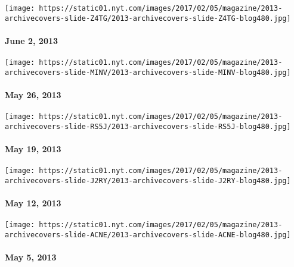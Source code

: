 \href{http://www.nytimes.com/indexes/2013/06/02/magazine/index.html}{}

\texttt{[image: https://static01.nyt.com/images/2017/02/05/magazine/2013-archivecovers-slide-Z4TG/2013-archivecovers-slide-Z4TG-blog480.jpg]}

\hypertarget{june-2-2013}{%
\paragraph{June 2, 2013}\label{june-2-2013}}

\href{http://www.nytimes.com/indexes/2013/05/26/magazine/index.html}{}

\texttt{[image: https://static01.nyt.com/images/2017/02/05/magazine/2013-archivecovers-slide-MINV/2013-archivecovers-slide-MINV-blog480.jpg]}

\hypertarget{may-26-2013}{%
\paragraph{May 26, 2013}\label{may-26-2013}}

\href{http://www.nytimes.com/indexes/2013/05/20/magazine/index.html}{}

\texttt{[image: https://static01.nyt.com/images/2017/02/05/magazine/2013-archivecovers-slide-RS5J/2013-archivecovers-slide-RS5J-blog480.jpg]}

\hypertarget{may-19-2013}{%
\paragraph{May 19, 2013}\label{may-19-2013}}

\href{http://www.nytimes.com/indexes/2013/05/12/magazine/index.html}{}

\texttt{[image: https://static01.nyt.com/images/2017/02/05/magazine/2013-archivecovers-slide-J2RY/2013-archivecovers-slide-J2RY-blog480.jpg]}

\hypertarget{may-12-2013}{%
\paragraph{May 12, 2013}\label{may-12-2013}}

\href{http://www.nytimes.com/indexes/2013/05/05/magazine/index.html}{}

\texttt{[image: https://static01.nyt.com/images/2017/02/05/magazine/2013-archivecovers-slide-ACNE/2013-archivecovers-slide-ACNE-blog480.jpg]}

\hypertarget{may-5-2013}{%
\paragraph{May 5, 2013}\label{may-5-2013}}

